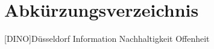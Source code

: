\documentclass[12pt]{article}
\begin{document}


\newpage
{} %
\tableofcontents

\newpage
\section*{Abkürzungsverzeichnis}
\begin{acronym}[WLAN]	%
	\setlength{\itemsep}{-\parsep} %
	[DINO]{Düsseldorf Information Nachhaltigkeit Offenheit}

\end{acronym}

\listoffigures
\newpage

\newpage


	
\end{document}
